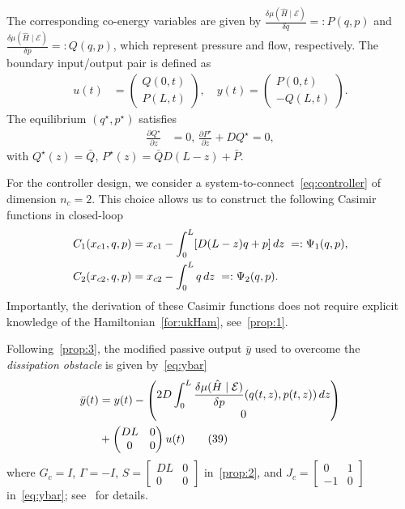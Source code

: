 \documentclass[letterpaper, 10 pt, conference]{ieeeconf}  %
\newcounter{part} %
\begin{document}
The corresponding co-energy variables are given by $\frac{\delta \mu(\hat{H}\mid\mathcal{E})}{\delta q} =: P(q,p)$ and $\frac{\delta \mu(\hat{H}\mid\mathcal{E})}{\delta p} =: Q(q,p)$, which represent pressure and flow, respectively. The boundary input/output pair is defined as
\begin{align}
u(t) &= 
\begin{pmatrix}
Q(0,t) \\
P(L,t)
\end{pmatrix},
\quad
y(t) =
\begin{pmatrix}
P(0,t) \\
-Q(L,t)
\end{pmatrix}.
\end{align}
The equilibrium $(q^\star, p^\star)$ satisfies
\begin{align}\label{for:eqpoint}
\frac{\partial Q^\star}{\partial z} &= 0,\, \frac{\partial P^\star}{\partial z} + D Q^\star = 0,
\end{align}
with $Q^\star(z) = \bar{Q},\,P^\star(z) = \bar{Q} D (L - z) + \bar{P}$.

For the controller design, we consider a system-to-connect~\cref{eq:controller} of dimension $n_c = 2$. This choice allows us to construct the following Casimir functions in closed-loop
\begin{align}
C_1(x_{c1}, q, p) &= x_{c1} - \int_0^L [D (L - z) q + p] \, dz \; =: \Psi_1(q,p), \notag\\
C_2(x_{c2}, q, p) &= x_{c2} - \int_0^L q \, dz \; =: \Psi_2(q,p).\label{for:casinex}
\end{align}
Importantly, the derivation of these Casimir functions does not require explicit knowledge of the Hamiltonian~\cref{for:ukHam}, see~\cref{prop:1}.

Following~\cref{prop:3}, the modified passive output $\bar{y}$ used to overcome the \emph{dissipation obstacle} is given by~\cref{eq:ybar}
\begin{align}
\bar{y}(t)
&=
y(t)
-
\begin{pmatrix}
2D \displaystyle\int_0^L \frac{\delta \mu(\hat{H}\mid\mathcal{E})}{\delta p}(q(t,z),p(t,z))\,dz \notag\\
0
\end{pmatrix}\\
&+
\begin{pmatrix}
DL & 0 \\
0 & 0
\end{pmatrix}
u(t)
\tag{39}
\end{align}
where $G_c=I$, $\Gamma=-I$, $S=\begin{bmatrix}
    DL & 0\\0 & 0
\end{bmatrix}$ in~\cref{prop:2}, and $J_c=\begin{bmatrix}
    0 & 1\\-1 & 0
\end{bmatrix}$ in~\cref{eq:ybar}; see~\cite{macchelli2015control} for details.
\end{document}
